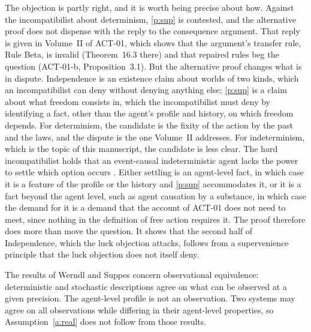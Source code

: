 \documentclass{situationist-preprint}
\begin{document}
\begin{reply}
The objection is partly right, and it is worth being precise about how. Against the incompatibilist about determinism, \ref{p:sup} is contested, and the alternative proof does not dispense with the reply to the consequence argument. That reply is given in Volume~II of ACT-01, which shows that the argument's transfer rule, Rule Beta, is invalid (Theorem~16.3 there) and that repaired rules beg the question (ACT-01-b, Proposition~3.1). But the alternative proof changes what is in dispute. Independence is an existence claim about worlds of two kinds, which an incompatibilist can deny without denying anything else; \ref{p:sup} is a claim about what freedom consists in, which the incompatibilist must deny by identifying a fact, other than the agent's profile and history, on which freedom depends. For determinism, the candidate is the fixity of the action by the past and the laws, and the dispute is the one Volume~II addresses. For indeterminism, which is the topic of this manuscript, the candidate is less clear. The hard incompatibilist holds that an event-causal indeterministic agent lacks the power to settle which option occurs \citep{Pereboom2014}. Either settling is an agent-level fact, in which case it is a feature of the profile or the history and \ref{p:sup} accommodates it, or it is a fact beyond the agent level, such as agent causation by a substance, in which case the demand for it is a demand that the account of ACT-01 does not need to meet, since nothing in the definition of free action requires it. The proof therefore does more than move the question. It shows that the second half of Independence, which the luck objection attacks, follows from a supervenience principle that the luck objection does not itself deny.
\end{reply}

\begin{objection}\label{o:obs}
The results of Werndl and Suppes concern observational equivalence: deterministic and stochastic descriptions agree on what can be observed at a given precision. The agent-level profile is not an observation. Two systems may agree on all observations while differing in their agent-level properties, so Assumption~\ref{a:real} does not follow from those results.
\end{objection}
\end{document}
